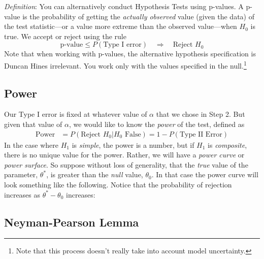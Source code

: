 \documentclass[12pt]{article}
\theoremstyle{plain}
\theoremstyle{definition}
\theoremstyle{remark}
\begin{document}
{\sl Definition}: You can alternatively conduct Hypothesis Tests using
p-values. A p-value is the probability of getting the
\emph{actually observed} value (given the data) of the test
statistic---or a value more extreme than the observed value---when
$H_0$ is true. We accept or reject using the rule
\[ \text{p-value} \leq P(\text{Type I error}) \quad
   \Rightarrow \quad \text{Reject $H_0$} \]
Note that when working with p-values, the alternative hypothesis
specification is Duncan Hines irrelevant. You work only with the
values specified in the null.\footnote{Note that this process doesn't
really take into account model uncertainty.}


\subsection{Power}

Our Type I error is fixed at whatever value of $\alpha$ that we
chose in Step 2. But given that value of $\alpha$, we would like
to know the \emph{power} of the test, defined as
\begin{align*}
   \text{Power} &= P(\text{Reject $H_0$} | H_0 \text{ False})
   =1 - P(\text{Type II Error})
\end{align*}
In the case where $H_1$ is \emph{simple}, the
power is a number, but if $H_1$ is \emph{composite}, there is
no unique value for the power.  Rather, we will have a
\emph{power curve}
or \emph{power surface}. So suppose without loss
of generality, that the \emph{true} value of the parameter, $\theta^*$,
is greater than the \emph{null} value, $\theta_0$.
In that case the power curve
will look something like the following.
Notice that the probability of rejection increases as
$\theta^*-\theta_0$ increases:

\subsection{Neyman-Pearson Lemma}
\end{document}
